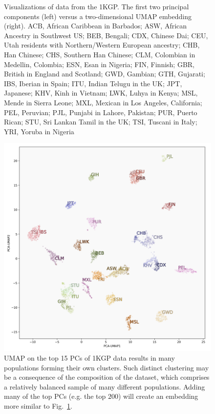 \documentclass[12pt]{article}
\begin{document}
\begin{figure}[h!]
\begin{subfigure}[b]{0.45\linewidth}
    \caption{}
    \label{fig:UMAP}
  \end{subfigure}
  \caption{Visualizations of data from the 1KGP. The first two principal components (left) versus a two-dimensional UMAP embedding (right).     ACB, African Caribbean in Barbados;
    ASW, African Ancestry in Southwest US;
    BEB, Bengali;
    CDX, Chinese Dai;
    CEU, Utah residents with Northern/Western European ancestry;
    CHB, Han Chinese;
    CHS, Southern Han Chinese;
    CLM, Colombian in Medellin, Colombia;
    ESN, Esan in Nigeria;
    FIN, Finnish;
    GBR, British in England and Scotland;
    GWD, Gambian;
    GTH, Gujarati;
    IBS, Iberian in Spain;
    ITU, Indian Telugu in the UK;
    JPT, Japanese;
    KHV, Kinh in Vietnam;
    LWK, Luhya in Kenya;
    MSL, Mende in Sierra Leone;
    MXL, Mexican in Los Angeles, California;
    PEL, Peruvian;
    PJL, Punjabi in Lahore, Pakistan;
    PUR, Puerto Rican;
    STU, Sri Lankan Tamil in the UK;
    TSI, Tuscani in Italy;
    YRI, Yoruba in Nigeria }
  \label{fig:PCA_and_UMAP}
\end{figure}

\clearpage

\begin{figure}
  \includegraphics[width=\linewidth]{code/images/1KGP_PCA_UMAP.png}
  \caption{UMAP on the top 15 PCs of 1KGP data results in many populations forming their own clusters. Such distinct clustering may be a consequence of the composition of the dataset, which comprises a relatively balanced sample of many different populations. Adding many of the top PCs (e.g. the top $200$) will create an embedding more similar to Fig.~\ref{fig:UMAP}. }
  \label{fig:UMAP_fine_scale}
\end{figure}
\end{document}
